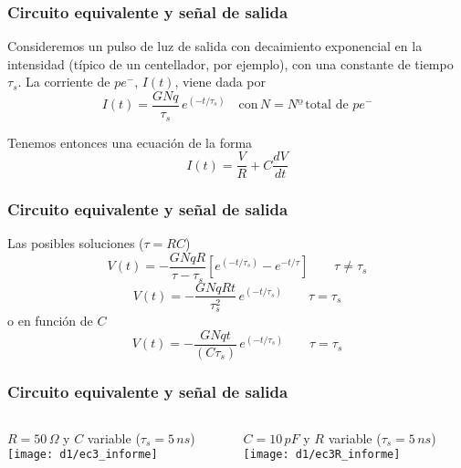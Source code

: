 \documentclass{beamer}
\begin{document}
\begin{frame}
\frametitle{Circuito equivalente y señal de salida}
\begin{block}{}
Consideremos un pulso de luz de salida con decaimiento exponencial en la
intensidad (t\'ipico de un centellador, por ejemplo), con una constante
de tiempo $\tau_s$. La corriente de $pe^-$, $I(t)$, viene dada por
$$I(t) = \frac{GNq}{\tau_s}\, e^{(-t/\tau_s)} \quad \text{con}\,N = Nº\,\text{
total de}\,\, pe^- $$

Tenemos entonces una ecuaci\'on de la forma 
$$I(t) = \frac{V}{R} + C \frac{dV}{dt}$$

\end{block}
\end{frame} 

\begin{frame}
\frametitle{Circuito equivalente y señal de salida}
\begin{block}{}
Las posibles soluciones ($\tau = RC$)
$$V(t) = - \frac{GNqR}{\tau - \tau_s}\left[e^{(-t/\tau_s)} -
e^{-t/\tau}\right]\qquad \tau \neq \tau_s$$
$$V(t) = - \frac{GNqRt}{\tau_s^2}\,e^{(-t/\tau_s)} \qquad \tau = \tau_s$$
o en funci\'on de $C$
$$V(t) = - \frac{GNqt}{(C \tau_s)}\, e^{(-t/\tau_s)} \qquad \tau = \tau_s$$
\end{block}
\end{frame} 

\begin{frame}
\frametitle{Circuito equivalente y señal de salida}
\begin{columns}
\begin{column}{0.5\textwidth}
\begin{center}
\footnotesize{{\color{blue}$R = 50\,\Omega$ y $C$ variable ($\tau_s = 5\,ns$)}}
\texttt{[image: d1/ec3\_informe]}
\end{center}
\end{column}
\begin{column}{0.5\textwidth}
\begin{center}
\footnotesize{{\color{blue}$C = 10\,pF$ y $R$ variable ($\tau_s = 5\,ns$)}}
\texttt{[image: d1/ec3R\_informe]}
\end{center}
\end{column}
\end{columns}
\end{frame}
\end{document}
